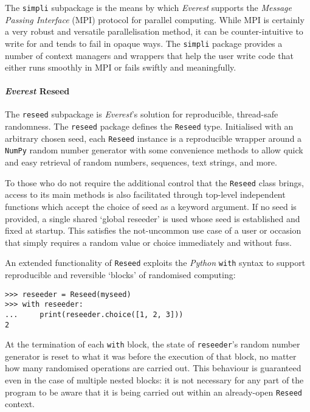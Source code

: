 \documentclass[a4paper,11pt,oneside]{book}
\begin{document}
The \texttt{simpli} subpackage is the means by which \textit{Everest} supports the \textit{Message Passing Interface} (MPI) protocol for parallel computing. While MPI is certainly a very robust and versatile parallelisation method, it can be counter-intuitive to write for and tends to fail in opaque ways. The \texttt{simpli} package provides a number of context managers and wrappers that help the user write code that either runs smoothly in MPI or fails swiftly and meaningfully.

\paragraph{\textit{Everest} Reseed}

The \texttt{reseed} subpackage is \textit{Everest}'s solution for reproducible, thread-safe randomness. The \texttt{reseed} package defines the \texttt{Reseed} type. Initialised with an arbitrary chosen seed, each \texttt{Reseed} instance is a reproducible wrapper around a \texttt{NumPy} random number generator with some convenience methods to allow quick and easy retrieval of random numbers, sequences, text strings, and more.

To those who do not require the additional control that the \texttt{Reseed} class brings, access to its main methods is also facilitated through top-level independent functions which accept the choice of seed as a keyword argument. If no seed is provided, a single shared `global reseeder' is used whose seed is established and fixed at startup. This satisfies the not-uncommon use case of a user or occasion that simply requires a random value or choice immediately and without fuss.

An extended functionality of \texttt{Reseed} exploits the \textit{Python} \texttt{with} syntax to support reproducible and reversible `blocks' of randomised computing:

\begin{verbatim}
>>> reseeder = Reseed(myseed)
>>> with reseeder:
...     print(reseeder.choice([1, 2, 3]))
2
\end{verbatim}

At the termination of each \texttt{with} block, the state of \texttt{reseeder}'s random number generator is reset to what it was before the execution of that block, no matter how many randomised operations are carried out. This behaviour is guaranteed even in the case of multiple nested blocks: it is not necessary for any part of the program to be aware that it is being carried out within an already-open \texttt{Reseed} context.
\end{document}
